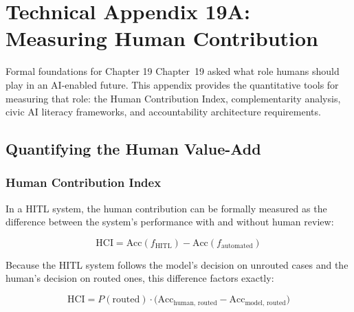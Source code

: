 
\chapter*{Technical Appendix 19A: Measuring Human Contribution}

\begin{chapterquote}{Formal foundations for Chapter 19}
Chapter~19 asked what role humans should play in an AI-enabled future. This appendix provides the quantitative tools for measuring that role: the Human Contribution Index, complementarity analysis, civic AI literacy frameworks, and accountability architecture requirements.
\end{chapterquote}

\apxnumon
\section{Quantifying the Human Value-Add}

\subsection{Human Contribution Index}

In a HITL system, the human contribution can be formally measured as the difference between the system's performance with and without human review:

\[
\text{HCI} = \text{Acc}(f_\text{HITL}) - \text{Acc}(f_\text{automated})
\]

Because the HITL system follows the model's decision on unrouted cases and the human's decision on routed ones, this difference factors exactly:

\[
\text{HCI} = P(\text{routed}) \cdot
  \bigl(\text{Acc}_\text{human, routed} - \text{Acc}_\text{model, routed}\bigr)
\]

